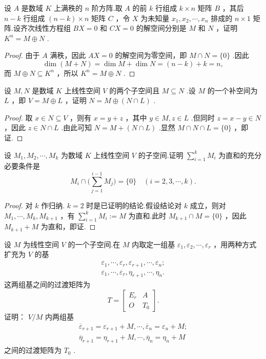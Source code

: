 \begin{prob}[20]
	设 $A$ 是数域 $K$ 上满秩的 $n$ 阶方阵.取 $A$ 的前 $k$ 行组成 $k\times n$ 矩阵 $B$ ，其后 $n-k$ 行组成 $(n-k)\times n$ 矩阵 $C$ ，令 $X$ 为未知量 $x_1,x_2,\cdots,x_n$ 排成的 $n\times 1$ 矩阵.设齐次线性方程组 $BX=0$ 和 $CX=0$ 的解空间分别是 $M$ 和 $N$ ，证明 $K^n=M\oplus N$ .
\end{prob}
\begin{proof}
	由于 $A$ 满秩，因此 $AX=0$ 的解空间为零空间，即 $M\cap N=\{0\}$ .因此
	\[
		\dim(M+N)=\dim M+\dim N=(n-k)+k=n,
	\]
	而 $M\oplus N\subseteq K^n$ ，所以 $K^n=M\oplus N$ .
\end{proof}
\begin{prob}[21]
	设 $M,N$ 是数域 $K$ 上线性空间 $V$ 的两个子空间且 $M\subseteq N$ .设 $M$ 的一个补空间为 $L$ ，即 $V=M\oplus L$ ，证明 $N=M\oplus(N\cap L)$ .
\end{prob}
\begin{proof}
	取 $x\in N\subseteq V$ ，则有 $x=y+z$ ，其中 $y\in M,z\in L$ .但同时 $z=x-y\in N$ ，因此 $z\in N\cap L$ .由此可知 $N=M+(N\cap L)$ .显然 $M\cap N\cap L=\{0\}$ ，即证.
\end{proof}
\begin{prob}[23]
	设 $M_1,M_2,\cdots,M_k$ 为数域 $K$ 上线性空间 $V$ 的子空间.证明 $\displaystyle \sum_{i=1}^{k}M_i$ 为直和的充分必要条件是
	\[
		M_i\cap\biggl(\sum_{j=1}^{i-1}M_j\biggr)=\{0\}\quad(i=2,3,\cdots,k).
	\]
\end{prob}
\begin{proof}
	对 $k$ 作归纳. $k=2$ 时是已证明的结论.假设结论对 $k$ 成立，则对 $M_1,\cdots,M_k,M_{k+1}$ ，有 $\displaystyle \sum_{i=1}^{k}M_i:=M$ 为直和.此时 $M_{k+1}\cap M=\{0\}$ ，因此 $M_{k+1}+M$ 为直和，即证.
\end{proof}
\begin{prob}[27]
	设 $M$ 为线性空间 $V$ 的一个子空间.在 $M$ 内取定一组基 $\varepsilon_1,\varepsilon_2,\cdots,\varepsilon_r$ ，用两种方式扩充为 $V$ 的基
	\begin{gather*}
		\varepsilon_1,\cdots,\varepsilon_r,\varepsilon_{r+1},\cdots,\varepsilon_n;\\
		\varepsilon_1,\cdots,\varepsilon_r,\eta_{r+1},\cdots,\eta_n.
	\end{gather*}
	这两组基之间的过渡矩阵为
	\[
		T=\begin{bmatrix}
			E_r & A   \\
			O   & T_0
		\end{bmatrix}.
	\]
	证明： $V/M$ 内两组基
	\begin{gather*}
		\overline{\varepsilon}_{r+1}=\varepsilon_{r+1}+M,\cdots,\overline{\varepsilon}_n=\varepsilon_n+M;\\
		\overline{\eta}_{r+1}=\eta_{r+1}+M,\cdots,\overline{\eta}_n=\eta_n+M
	\end{gather*}
	之间的过渡矩阵为 $T_0$ .
\end{prob}
